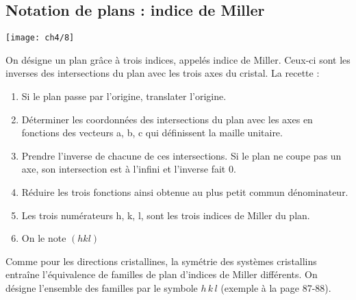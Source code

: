 	\subsection{Notation de plans : indice de Miller}
		\begin{center}
		\texttt{[image: ch4/8]}
		\end{center}	
		On désigne un plan grâce à trois indices, appelés indice de Miller. Ceux-ci sont les inverses des intersections du plan avec les trois axes du cristal. La recette : 
		\begin{enumerate}
			\item Si le plan passe par l'origine, translater l'origine.
			\item Déterminer les coordonnées des intersections du plan avec les axes en fonctions des vecteurs a, b, c qui définissent la maille unitaire. 
			\item Prendre l'inverse de chacune de ces intersections. Si le plan ne coupe pas un axe, son intersection est à l'infini et l'inverse fait 0.
			\item Réduire les trois fonctions ainsi obtenue au plus petit commun dénominateur.
			\item Les trois numérateurs h, k, l, sont les trois indices de Miller du plan.
			\item On le note $(hkl)$
		\end{enumerate}
		Comme pour les directions cristallines, la symétrie des systèmes cristallins entraîne l'équivalence de familles de plan d'indices de Miller différents. On désigne l'ensemble des familles par le symbole ${h \, k \, l}$ (exemple à la page 87-88). 
